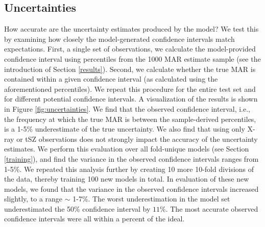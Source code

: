 \documentclass[twocolumn, linenumbers, 11pt]{aastex63}%
\begin{document}
\subsection{Uncertainties}\label{uncertainty}
How accurate are the uncertainty estimates produced by the model? We test this by examining how closely the model-generated confidence intervals match expectations. First, a single set of observations, we calculate the model-provided confidence interval using percentiles from the 1000 MAR estimate sample (see the introduction of Section \ref{results}). Second, we calculate whether the true MAR is contained within a given confidence interval (as calculated using the aforementioned percentiles). We repeat this procedure for the entire test set and for different potential confidence intervals. A visualization of the results is shown in Figure \ref{fig:uncertainties}. We find that the observed confidence interval, i.e., the frequency at which the true MAR is between the sample-derived percentiles, is a 1-5\% underestimate of the true uncertainty. We also find that using only X-ray or tSZ observations does not strongly impact the accuracy of the uncertainty estimates. We perform this evaluation over all fold-unique models (see Section \ref{training}), and find the variance in the observed confidence intervals ranges from 1-5\%. We repeated this analysis further by creating 10 more 10-fold divisions of the data, thereby training 100 new models in total. In evaluation of these new models, we found that the variance in the observed confidence intervals increased slightly, to a range $\sim$ 1-7\%. The worst underestimation in the model set underestimated the 50\% confidence interval by $11\%$. The most accurate observed confidence intervals were all within a percent of the ideal.
\end{document}
